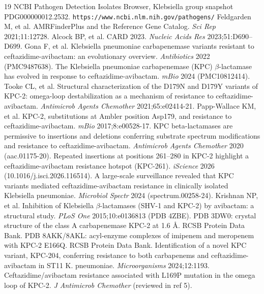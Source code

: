 \documentclass[11pt]{article}
\begin{document}
\begin{thebibliography}{19}\small
{} NCBI Pathogen Detection Isolates Browser, Klebsiella group snapshot PDG000000012.2532. \texttt{https://www.ncbi.nlm.nih.gov/pathogens/}
 Feldgarden M, et al. AMRFinderPlus and the Reference Gene Catalog. \emph{Sci Rep} 2021;11:12728.
 Alcock BP, et al. CARD 2023. \emph{Nucleic Acids Res} 2023;51:D690--D699.
 Gona F, et al. Klebsiella pneumoniae carbapenemase variants resistant to ceftazidime-avibactam: an evolutionary overview. \emph{Antibiotics} 2022 (PMC9487638).
 The Klebsiella pneumoniae carbapenemase (KPC) $\beta$-lactamase has evolved in response to ceftazidime-avibactam. \emph{mBio} 2024 (PMC10812414).
 Tooke CL, et al. Structural characterization of the D179N and D179Y variants of KPC-2: omega-loop destabilization as a mechanism of resistance to ceftazidime-avibactam. \emph{Antimicrob Agents Chemother} 2021;65:e02414-21.
 Papp-Wallace KM, et al. KPC-2, substitutions at Ambler position Asp179, and resistance to ceftazidime-avibactam. \emph{mBio} 2017;8:e00528-17.
 KPC beta-lactamases are permissive to insertions and deletions conferring substrate spectrum modifications and resistance to ceftazidime-avibactam. \emph{Antimicrob Agents Chemother} 2020 (aac.01175-20).
 Repeated insertions at positions 261--280 in KPC-2 highlight a ceftazidime-avibactam resistance hotspot (KPC-261). \emph{iScience} 2026 (10.1016/j.isci.2026.116514).
 A large-scale surveillance revealed that KPC variants mediated ceftazidime-avibactam resistance in clinically isolated Klebsiella pneumoniae. \emph{Microbiol Spectr} 2024 (spectrum.00258-24).
 Krishnan NP, et al. Inhibition of Klebsiella $\beta$-lactamases (SHV-1 and KPC-2) by avibactam: a structural study. \emph{PLoS One} 2015;10:e0136813 (PDB 4ZBE).
 PDB 3DW0: crystal structure of the class A carbapenemase KPC-2 at 1.6 \AA. RCSB Protein Data Bank.
 PDB 8AKK/8AKL: acyl-enzyme complexes of imipenem and meropenem with KPC-2 E166Q. RCSB Protein Data Bank.
 Identification of a novel KPC variant, KPC-204, conferring resistance to both carbapenems and ceftazidime-avibactam in ST11 K. pneumoniae. \emph{Microorganisms} 2024;12:1193.
 Ceftazidime/avibactam resistance associated with L169P mutation in the omega loop of KPC-2. \emph{J Antimicrob Chemother} (reviewed in ref 5).
\end{thebibliography}
\end{document}
